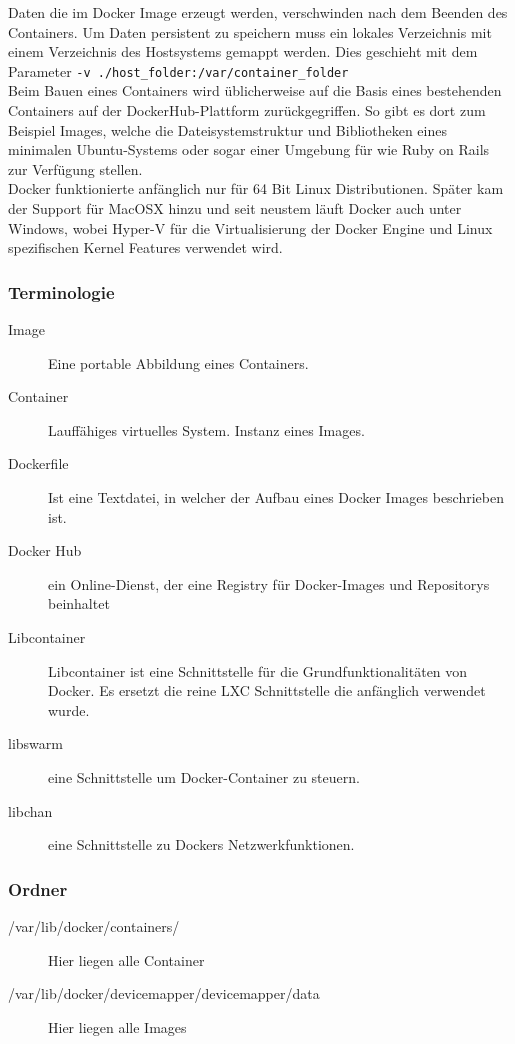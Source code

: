 Daten die im Docker Image erzeugt werden, verschwinden nach dem Beenden des Containers. Um Daten persistent zu speichern muss ein lokales Verzeichnis mit einem Verzeichnis des Hostsystems gemappt werden. Dies geschieht mit dem Parameter \lstinline[]|-v ./host_folder:/var/container_folder| \\

Beim Bauen eines Containers wird üblicherweise auf die Basis eines bestehenden Containers auf der DockerHub-Plattform zurückgegriffen. So gibt es dort zum Beispiel Images, welche die Dateisystemstruktur und Bibliotheken eines minimalen Ubuntu-Systems oder sogar einer Umgebung für  wie Ruby on Rails zur Verfügung stellen. \\

Docker funktionierte anfänglich nur für 64 Bit Linux Distributionen. Später kam der Support für MacOSX hinzu und seit neustem läuft Docker auch unter Windows, wobei Hyper-V für die Virtualisierung der Docker Engine und Linux spezifischen Kernel Features verwendet wird.

\newpage

\subsubsection{Terminologie}
\begin{description}
	\item[Image] Eine portable Abbildung eines Containers.
	\item[Container] Lauffähiges virtuelles System. Instanz eines Images.
	\item[Dockerfile] Ist eine Textdatei, in welcher der Aufbau eines Docker Images beschrieben ist.
	\item[Docker Hub] ein Online-Dienst, der eine Registry für Docker-Images und Repositorys beinhaltet
	\item[Libcontainer] Libcontainer ist eine Schnittstelle für die Grundfunktionalitäten von Docker. Es ersetzt die reine LXC Schnittstelle die anfänglich verwendet wurde. 
	\item[libswarm]eine Schnittstelle um Docker-Container zu steuern.
	\item[libchan] eine Schnittstelle zu Dockers Netzwerkfunktionen.
\end{description}

\subsubsection{Ordner}
\begin{description}
	\item[/var/lib/docker/containers/] Hier liegen alle Container
	\item[/var/lib/docker/devicemapper/devicemapper/data] Hier liegen alle Images
\end{description}

